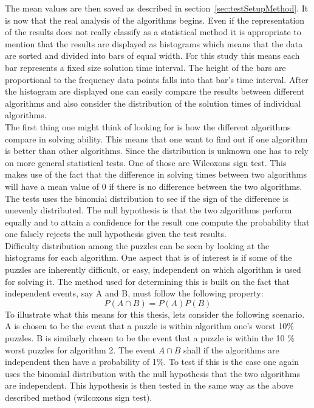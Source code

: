 \documentclass[a4paper,11pt]{kth-mag}
\begin{document}
The mean values are then saved as described in section~\ref{sec:testSetupMethod}.
It is now that the real analysis of the algorithms begins. 
Even if the representation of the results does not really classify as a statistical method it is appropriate to mention that the results are displayed as histograms which means that the data are sorted and divided into bars of equal width. 
For this study this means each bar represents a fixed size solution time interval. 
The height of the bars are proportional to the frequency data points falls into that bar's time interval.
After the histogram are displayed one can easily compare the results between different algorithms and also consider the distribution of the solution times of individual algorithms.\\
The first thing one might think of looking for is how the different algorithms compare in solving ability. 
This means that one want to find out if one algorithm is better than other algorithms. 
Since the distribution is unknown one has to rely on more general statistical tests. 
One of those are Wilcoxons sign test. 
This makes use of the fact that the difference in solving times between two algorithms will have a mean value of 0 if there is no difference between the two algorithms. 
The tests uses the binomial distribution to see if the sign of the difference is unevenly distributed.
The null hypothesis is that the two algorithms perform equally and to attain a confidence for the result one compute the probability that one falsely rejects the null hypothesis given the test results.
\\
Difficulty distribution among the puzzles can be seen by looking at the histograms for each algorithm.
One aspect that is of interest is if some of the puzzles are inherently difficult, or easy, independent on which algorithm is used for solving it.
The method used for determining this is built on the fact that independent events, say A and B, must follow the following property:
\[
P(A \cap B) = P(A) P(B)
\] 
To illustrate what this means for this thesis, lets consider the following scenario.
A is chosen to be the event that a puzzle is within algorithm one's worst 10\% puzzles.
B is similarly chosen to be the event that a puzzle is within the 10 \% worst puzzles for algorithm 2.
The event $A \cap B$ shall if the algorithms are independent then have a probability of 1\%.
To test if this is the case one again uses the binomial distribution with the null hypothesis that the two algorithms are independent.
This hypothesis is then tested in the same way as the above described method (wilcoxons sign test).
\end{document}
